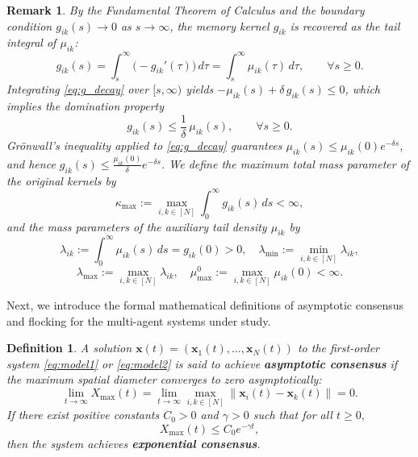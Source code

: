 \documentclass[11pt]{amsart}
\newtheorem{remark}{Remark}[section]
\newtheorem{definition}{Definition}[section]
\numberwithin{equation}{section}
\begin{document}
\begin{remark}\label{rem:kernel_implication}
{\rm
By the Fundamental Theorem of Calculus and the boundary condition $g_{ik}(s) \rightarrow  0$ as $s\rightarrow \infty$, the memory kernel $g_{ik}$ is recovered as the tail integral of $\mu_{ik}$:
\begin{equation*}\label{eq:g_as_tail_of_mu}
g_{ik}(s) = \int_s^\infty \big(-g_{ik}'(\tau)\big)\,d\tau = \int_s^\infty \mu_{ik}(\tau)\,d\tau, \qquad \forall s \ge 0.
\end{equation*}
Integrating \eqref{eq:g_decay} over $[s,\infty)$ yields $-\mu_{ik}(s) + \delta\, g_{ik}(s) \le 0$, which implies the domination property
\begin{equation*} \label{eq:mu_domination}
g_{ik}(s) \le \frac{1}{\delta}\, \mu_{ik}(s), \qquad \forall s\ge0.
\end{equation*}
Gr\"onwall's inequality applied to \eqref{eq:g_decay} guarantees $\mu_{ik}(s)\le \mu_{ik}(0)e^{-\delta s}$, and hence $g_{ik}(s)\le \frac{\mu_{ik}(0)}{\delta}e^{-\delta s}$. We define the maximum total mass parameter of the original kernels by
\begin{equation*}
\kappa_{\max} := \max_{i,k\in[N]} \int_0^\infty g_{ik}(s)\,ds < \infty,
\end{equation*}
and the mass parameters of the auxiliary tail density $\mu_{ik}$ by
$$
\lambda_{ik} := \int_0^\infty \mu_{ik}(s)\,ds = g_{ik}(0) > 0, \quad \lambda_{\min} := \min_{i,k\in[N]}\lambda_{ik},
$$
$$
\lambda_{\max} := \max_{i,k\in[N]}\lambda_{ik}, \quad \mu^0_{\max} := \max_{i,k\in[N]} \mu_{ik}(0) < \infty.
$$
}
\end{remark}

Next, we introduce the formal mathematical definitions of asymptotic consensus and flocking for the multi-agent systems under study.


\begin{definition}\label{def:consensus}
{\rm
A solution $\boldsymbol{x}(t) = (\boldsymbol{x}_1(t), \ldots, \boldsymbol{x}_N(t))$ to the first-order system \eqref{eq:model1} or \eqref{eq:model2} is said to achieve \textbf{asymptotic  consensus} if the maximum spatial diameter converges to zero asymptotically:
\begin{equation*}
\lim_{t \to \infty} X_{\max}(t) = \lim_{t \to \infty} \max_{i,k\in[N]} \|\boldsymbol{x}_i(t) - \boldsymbol{x}_k(t)\| = 0.
\end{equation*}
If there exist positive constants $C_0 > 0$ and $\gamma > 0$ such that for all $t \ge 0,$
$$
X_{\max}(t) \le C_0 e^{-\gamma t},
$$
then the system achieves \textbf{exponential consensus}.
}
\end{definition}
\end{document}
